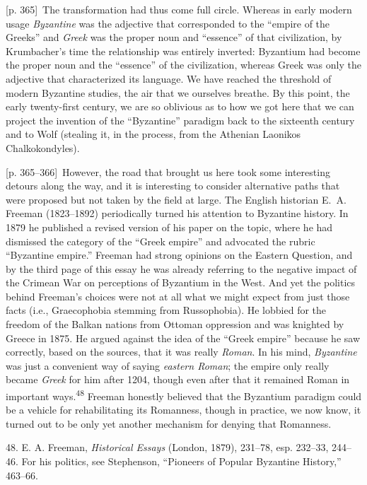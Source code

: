 \documentclass[10pt,a4paper]{article}
\begin{document}
{\scriptsize\color{gray}[p. 365]}\ The transformation had thus come full circle. Whereas in early modern usage \textit{Byzantine} was the adjective that corresponded to the “empire of the Greeks” and \textit{Greek} was the proper noun and “essence” of that civilization, by Krumbacher’s time the relationship was entirely inverted: Byzantium had become the proper noun and the “essence” of the civilization, whereas Greek was only the adjective that characterized its language. We have reached the threshold of modern Byzantine studies, the air that we ourselves breathe. By this point, the early twenty-first century, we are so oblivious as to how we got here that we can project the invention of the “Byzantine” paradigm back to the sixteenth century and to Wolf (stealing it, in the process, from the Athenian Laonikos Chalkokondyles).\par
{\scriptsize\color{gray}[p. 365–366]}\ However, the road that brought us here took some interesting detours along the way, and it is interesting to consider alternative paths that were proposed but not taken by the field at large. The English historian E. A. Freeman (1823–1892) periodically turned his attention to Byzantine history. In 1879 he published a revised version of his paper on the topic, where he had dismissed the category of the “Greek empire” and advocated the rubric “Byzantine empire.” Freeman had strong opinions on the Eastern Question, and by the third page of this essay he was already referring to the negative impact of the Crimean War on perceptions of Byzantium in the West. And yet the politics behind Freeman’s choices were not at all what we might expect from just those facts (i.e., Graecophobia stemming from Russophobia). He lobbied for the freedom of the Balkan nations from Ottoman oppression and was knighted by Greece in 1875. He argued against the idea of the “Greek empire” because he saw correctly, based on the sources, that it was really \textit{Roman}. In his mind, \textit{Byzantine} was just a convenient way of saying \textit{eastern Roman}; the empire only really became \textit{Greek} for him after 1204, though even after that it remained Roman in important ways.\nobreak\textsuperscript{48} Freeman honestly believed that the Byzantium paradigm could be a vehicle for rehabilitating its Romanness, though in practice, we now know, it turned out to be only yet another mechanism for denying that Romanness.\par{\small 48. E. A. Freeman, \textit{Historical Essays} (London, 1879), 231–78, esp. 232–33, 244–46. For his politics, see Stephenson, “Pioneers of Popular Byzantine History,” 463–66.\par}
\end{document}
